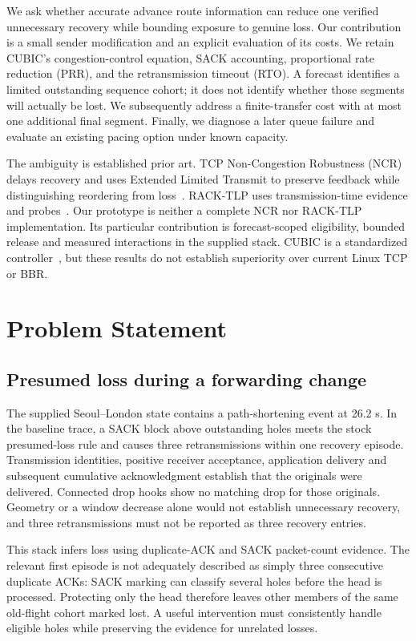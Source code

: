 \documentclass[conference]{IEEEtran}
\begin{document}
We ask whether accurate advance route information can reduce one
verified unnecessary recovery while bounding exposure to genuine loss.
Our contribution is a small sender modification and an explicit
evaluation of its costs. We retain CUBIC's congestion-control equation,
SACK accounting, proportional rate reduction (PRR), and the retransmission
timeout (RTO). A forecast identifies a limited outstanding sequence
cohort; it does not identify whether those segments will actually be
lost. We subsequently address a finite-transfer cost with at most one
additional final segment. Finally, we diagnose a later queue failure and
evaluate an existing pacing option under known capacity.

The ambiguity is established prior art. TCP Non-Congestion Robustness
(NCR) delays recovery and uses Extended Limited Transmit to preserve
feedback while distinguishing reordering from loss~\cite{ncr}.
RACK-TLP uses transmission-time evidence and probes~\cite{rack}.
Our prototype is neither a complete NCR nor RACK-TLP implementation.
Its particular contribution is forecast-scoped eligibility, bounded
release and measured interactions in the supplied stack. CUBIC is a
standardized controller~\cite{cubic}, but these results do not establish
superiority over current Linux TCP or BBR.

\section{Problem Statement}
\subsection{Presumed loss during a forwarding change}
The supplied Seoul--London state contains a path-shortening event at
26.2 s. In the baseline trace, a SACK block above outstanding holes meets
the stock presumed-loss rule and causes three retransmissions within one
recovery episode. Transmission identities, positive receiver acceptance,
application delivery and subsequent cumulative acknowledgment establish
that the originals were delivered. Connected drop hooks show no matching
drop for those originals. Geometry or a window decrease alone would not
establish unnecessary recovery, and three retransmissions must not be
reported as three recovery entries.

This stack infers loss using duplicate-ACK and SACK packet-count evidence.
The relevant first episode is not adequately described as simply three
consecutive duplicate ACKs: SACK marking can classify several holes
before the head is processed. Protecting only the head therefore leaves
other members of the same old-flight cohort marked lost. A useful
intervention must consistently handle eligible holes while preserving
the evidence for unrelated losses.
\end{document}
